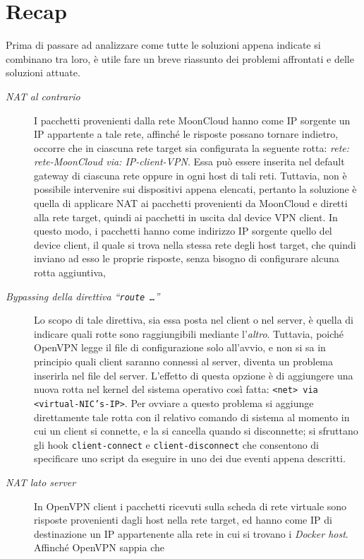 \section{Recap}
Prima di passare ad analizzare come tutte le soluzioni appena indicate si combinano
tra loro, è utile fare un breve riassunto dei problemi affrontati
e delle soluzioni attuate.
\begin{description}
  \item[\textit{NAT al contrario}]I pacchetti provenienti dalla rete MoonCloud
  hanno come IP sorgente un IP appartente a tale rete, affinché le risposte possano
  tornare indietro, occorre che in ciascuna rete target sia configurata la
  seguente rotta: \textit{rete: rete-MoonCloud via: IP-client-VPN}. Essa può
  essere inserita nel default gateway di ciascuna rete oppure in ogni host di tali reti.
  Tuttavia, non è possibile intervenire sui dispositivi appena elencati, pertanto
  la soluzione è quella di applicare NAT ai pacchetti provenienti da MoonCloud e
  diretti alla rete target, quindi ai pacchetti in uscita dal device VPN client.
  In questo modo, i pacchetti hanno come indirizzo IP sorgente quello del device
  client, il quale si trova nella stessa rete degli host target, che quindi inviano
  ad esso le proprie risposte, senza bisogno di configurare alcuna rotta
  aggiuntiva,
  \item[\textit{Bypassing della direttiva ``\texttt{route \ldots}''}]Lo
  scopo di tale direttiva, sia essa posta nel client o nel server, è quella di
  indicare quali rotte sono raggiungibili mediante l'\textit{altro}. Tuttavia, poiché
  OpenVPN legge il file di configurazione solo all'avvio, e non si sa in principio
  quali client saranno connessi al server, diventa un problema inserirla nel file
  del server. L'effetto di questa opzione è di aggiungere una nuova rotta nel kernel
  del sistema operativo così fatta: \texttt{<net> via <virtual-NIC's-IP>}. Per
  ovviare a questo problema si aggiunge direttamente tale rotta con il relativo comando di
  sistema al momento in cui un client si connette, e la si cancella quando si
  disconnette; si sfruttano gli hook \texttt{client-connect} e \texttt{client-disconnect}
  che consentono di specificare uno script da eseguire in uno dei due eventi
  appena descritti.
  \item[\textit{NAT lato server}]In OpenVPN
  client i pacchetti ricevuti sulla scheda di rete virtuale sono risposte provenienti
  dagli host nella rete target, ed hanno come IP di destinazione un IP appartenente
  alla rete in cui si trovano i \textit{Docker host}. Affinché OpenVPN sappia che

\end{description}
